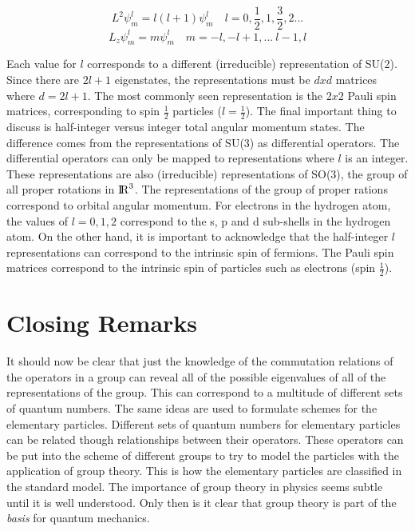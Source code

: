 \documentclass{article}
\begin{document}
\begin{equation}
L^2\psi_m^l = l(l + 1)\psi_m^l \quad l = 0, \frac{1}{2}, 1, \frac{3}{2}, 2... 
\end{equation}
\begin{equation}
L_z\psi_m^l = m\psi_m^l \quad m = -l, -l + 1, ...\:l - 1, l
\end{equation}

Each value for $l$ corresponds to a different (irreducible) representation of SU(2). Since there are $2l + 1$ eigenstates, the representations must be $d x d$ matrices where $d = 2l + 1$. The most commonly seen representation is the $2 x 2$ Pauli spin matrices, corresponding to spin $\frac{1}{2}$ particles ($l = \frac{1}{2}$). The final important thing to discuss is half-integer versus integer total angular momentum states. The difference comes from the representations of SU(3) as differential operators. The differential operators can only be mapped to representations where $l$ is an integer. These representations are also (irreducible) representations of SO(3), the group of all proper rotations in ${\rm I\!R}^3$. The representations of the group of proper rations correspond to orbital angular momentum. For electrons in the hydrogen atom, the values of $l = 0, 1, 2$ correspond to the s, p and d sub-shells in the hydrogen atom. On the other hand, it is important to acknowledge that the half-integer $l$ representations can correspond to the intrinsic spin of fermions. The Pauli spin matrices correspond to the intrinsic spin of particles such as electrons (spin $\frac{1}{2}$).

\section{Closing Remarks}
It should now be clear that just the knowledge of the commutation relations of the operators in a group can reveal all of the possible eigenvalues of all of the representations of the group. This can correspond to a multitude of different sets of quantum numbers. The same ideas are used to formulate schemes for the elementary particles. Different sets of quantum numbers for elementary particles can be related though relationships between their operators. These operators can be put into the scheme of different groups to try to model the particles with the application of group theory. This is how the elementary particles are classified in the standard model. The importance of group theory in physics seems subtle until it is well understood. Only then is it clear that group theory is part of the \textit{basis} for quantum mechanics.
\end{document}
